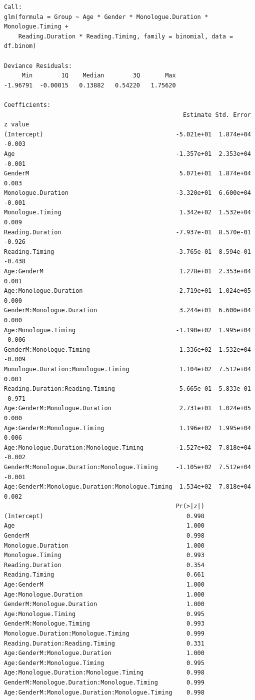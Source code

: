 \documentclass[
  english,
  doc,floatsintext]{apa6}
\begin{document}
\begin{verbatim}
Call:
glm(formula = Group ~ Age * Gender * Monologue.Duration * Monologue.Timing + 
    Reading.Duration * Reading.Timing, family = binomial, data = df.binom)

Deviance Residuals: 
     Min        1Q    Median        3Q       Max  
-1.96791  -0.00015   0.13882   0.54220   1.75620  

Coefficients:
                                                  Estimate Std. Error z value
(Intercept)                                     -5.021e+01  1.874e+04  -0.003
Age                                             -1.357e+01  2.353e+04  -0.001
GenderM                                          5.071e+01  1.874e+04   0.003
Monologue.Duration                              -3.320e+01  6.600e+04  -0.001
Monologue.Timing                                 1.342e+02  1.532e+04   0.009
Reading.Duration                                -7.937e-01  8.570e-01  -0.926
Reading.Timing                                  -3.765e-01  8.594e-01  -0.438
Age:GenderM                                      1.278e+01  2.353e+04   0.001
Age:Monologue.Duration                          -2.719e+01  1.024e+05   0.000
GenderM:Monologue.Duration                       3.244e+01  6.600e+04   0.000
Age:Monologue.Timing                            -1.190e+02  1.995e+04  -0.006
GenderM:Monologue.Timing                        -1.336e+02  1.532e+04  -0.009
Monologue.Duration:Monologue.Timing              1.104e+02  7.512e+04   0.001
Reading.Duration:Reading.Timing                 -5.665e-01  5.833e-01  -0.971
Age:GenderM:Monologue.Duration                   2.731e+01  1.024e+05   0.000
Age:GenderM:Monologue.Timing                     1.196e+02  1.995e+04   0.006
Age:Monologue.Duration:Monologue.Timing         -1.527e+02  7.818e+04  -0.002
GenderM:Monologue.Duration:Monologue.Timing     -1.105e+02  7.512e+04  -0.001
Age:GenderM:Monologue.Duration:Monologue.Timing  1.534e+02  7.818e+04   0.002
                                                Pr(>|z|)
(Intercept)                                        0.998
Age                                                1.000
GenderM                                            0.998
Monologue.Duration                                 1.000
Monologue.Timing                                   0.993
Reading.Duration                                   0.354
Reading.Timing                                     0.661
Age:GenderM                                        1.000
Age:Monologue.Duration                             1.000
GenderM:Monologue.Duration                         1.000
Age:Monologue.Timing                               0.995
GenderM:Monologue.Timing                           0.993
Monologue.Duration:Monologue.Timing                0.999
Reading.Duration:Reading.Timing                    0.331
Age:GenderM:Monologue.Duration                     1.000
Age:GenderM:Monologue.Timing                       0.995
Age:Monologue.Duration:Monologue.Timing            0.998
GenderM:Monologue.Duration:Monologue.Timing        0.999
Age:GenderM:Monologue.Duration:Monologue.Timing    0.998


\end{verbatim}
\end{document}
